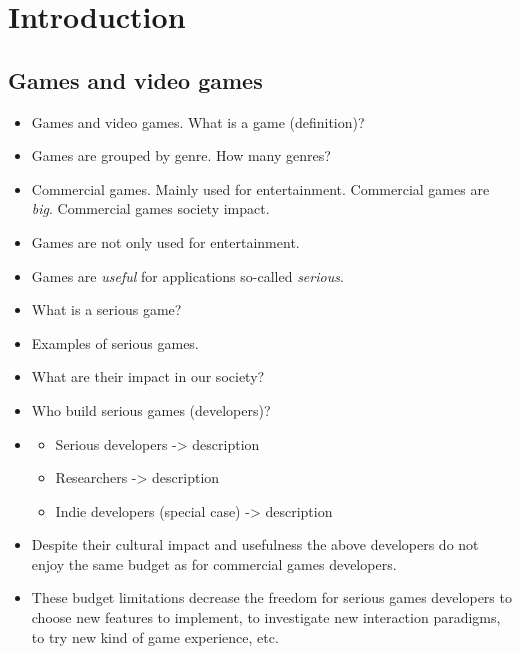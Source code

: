 \documentclass[10pt,a4paper]{book}
\author{Mohamed Abbadi}
\begin{document}
\tableofcontents


\chapter{Introduction}
\section{Games and video games}
\begin{itemize}

\item Games and video games. What is a game (definition)?\\
\item Games are grouped by genre. How many genres?\\
\item Commercial games. Mainly used for entertainment. Commercial games are \textit{big}. Commercial games society impact.\\
\item Games are not only used for entertainment.\\
\item Games are \textit{useful} for applications so-called \textit{serious}.\\
\item What is a serious game?\\
\item Examples of serious games.\\
\item What are their impact in our society?\\
\item Who build serious games (developers)?\\
\item \begin{itemize}
\item Serious developers -> description
\item Researchers -> description
\item Indie developers (special case) -> description
\end{itemize}
\item Despite their cultural impact and usefulness the above developers do not enjoy the same budget as for commercial games developers.\\
\item These budget limitations decrease the freedom for serious games developers to choose new features to implement, to investigate new interaction paradigms, to try new kind of game experience, etc.\\

\end{itemize}
\end{document}

